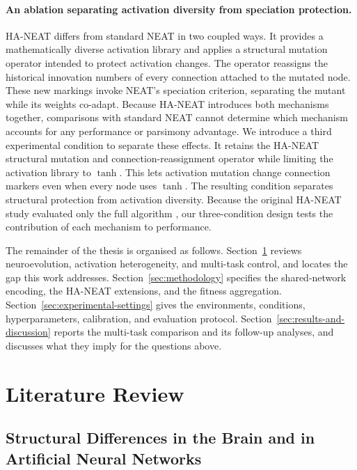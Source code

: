 \documentclass[12pt]{article}
\begin{document}
\paragraph{An ablation separating activation diversity from speciation protection.}
HA-NEAT \parencite{hagg_evolving_2017} differs from standard NEAT \parencite{stanley_evolving_2002} in two coupled ways. 
It provides a mathematically diverse activation library and applies a structural mutation operator intended to protect activation changes. 
The operator reassigns the historical innovation numbers of every connection attached to the mutated node. 
These new markings invoke NEAT's speciation criterion, separating the mutant while its weights co-adapt. 
Because HA-NEAT introduces both mechanisms together, comparisons with standard NEAT cannot determine which mechanism accounts for any performance or parsimony advantage.
We introduce a third experimental condition to separate these effects. 
It retains the HA-NEAT structural mutation and connection-reassignment operator while limiting the activation library to $\tanh$. 
This lets activation mutation change connection markers even when every node uses $\tanh$.
The resulting condition separates structural protection from activation diversity. 
Because the original HA-NEAT study evaluated only the full algorithm \parencite{hagg_evolving_2017}, our three-condition design tests the contribution of each mechanism to performance.


The remainder of the thesis is organised as follows.
Section~\ref{sec:literature-review} reviews neuroevolution, activation heterogeneity, and multi-task control, and locates the gap this work addresses.
Section~\ref{sec:methodology} specifies the shared-network encoding, the HA-NEAT extensions, and the fitness aggregation.
Section~\ref{sec:experimental-settings} gives the environments, conditions, hyperparameters, calibration, and evaluation protocol.
Section~\ref{sec:results-and-discussion} reports the multi-task comparison and its follow-up analyses, and discusses what they imply for the questions above.

\newpage
\section{Literature Review}
\label{sec:literature-review}


\subsection{Structural Differences in the Brain and in Artificial Neural Networks}
\label{subsec:structural-differences-in-the-brain-and}
\end{document}
